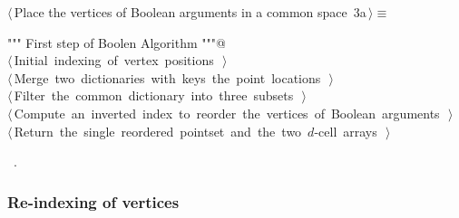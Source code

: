 \documentclass[11pt,oneside]{article}	%
\begin{document}
\begin{flushleft} \small \label{scrap2}
\protect{}$\langle\,$Place the vertices of Boolean arguments in a common space\nobreak\ {\footnotesize 3a}$\,\rangle\equiv$
\vspace{-1ex}
\begin{list}{}{} \item
\mbox{}\verb@""" First step of Boolen Algorithm """@\\
\mbox{}\verb@@\hbox{$\langle\,$Initial indexing of vertex positions\nobreak\ {\footnotesize {}}$\,\rangle$}\verb@@\\
\mbox{}\verb@@\hbox{$\langle\,$Merge two dictionaries with keys the point locations\nobreak\ {\footnotesize {}}$\,\rangle$}\verb@@\\
\mbox{}\verb@@\hbox{$\langle\,$Filter the common dictionary into three subsets\nobreak\ {\footnotesize {}}$\,\rangle$}\verb@@\\
\mbox{}\verb@@\hbox{$\langle\,$Compute an inverted index to reorder the vertices of Boolean arguments\nobreak\ {\footnotesize {}}$\,\rangle$}\verb@@\\
\mbox{}\verb@@\hbox{$\langle\,$Return the single reordered pointset and the two $d$-cell arrays\nobreak\ {\footnotesize {}}$\,\rangle$}\verb@@\\
\mbox{}\verb@@{\NWsep}
\end{list}
\vspace{-1ex}
\footnotesize\addtolength{\baselineskip}{-1ex}
\begin{list}{}{\setlength{\itemsep}{-\parsep}\setlength{\itemindent}{-\leftmargin}}
\item \NWtxtMacroRefIn\ .
\end{list}
\end{flushleft}

\subsubsection{Re-indexing of vertices}
\end{document}

